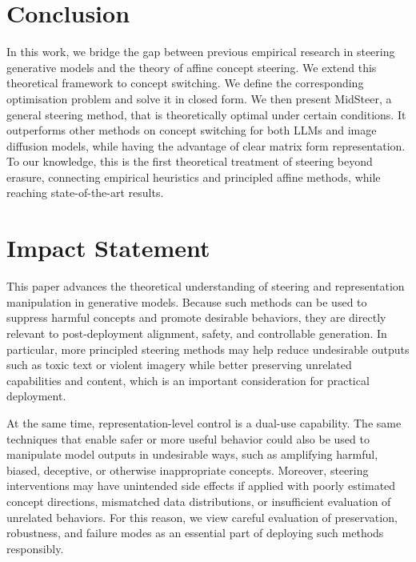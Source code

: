 \documentclass{article}
\theoremstyle{plain}
\theoremstyle{definition}
\theoremstyle{remark}
\newcommand{\ili}[1]{\textbf{[Ili]}  \; {\color{blue}#1}}
\begin{document}


\section{Conclusion}

In this work, we bridge the gap between previous empirical research in steering generative models and the theory of affine concept steering. We extend this theoretical framework to concept switching. We define the corresponding optimisation problem and solve it in closed form.
We then present MidSteer, a general steering method, that is theoretically optimal under certain conditions. It outperforms other methods on concept switching for both LLMs and image diffusion models, while having the advantage of clear matrix form representation. To our knowledge, this is the first theoretical treatment of steering beyond erasure, connecting empirical heuristics and principled affine methods, while reaching state-of-the-art results.


\section*{Impact Statement}
This paper advances the theoretical understanding of steering and representation manipulation in generative models.  Because such methods can be used to suppress harmful concepts and promote desirable behaviors, they are directly relevant to post-deployment alignment, safety, and controllable generation. In particular, more principled steering methods may help reduce undesirable outputs such as toxic text or violent imagery while better preserving unrelated capabilities and content, which is an important consideration for practical deployment.

At the same time, representation-level control is a dual-use capability. The same techniques that enable safer or more useful behavior could also be used to manipulate model outputs in undesirable ways, such as amplifying harmful, biased, deceptive, or otherwise inappropriate concepts.  Moreover, steering interventions may have unintended side effects if applied with poorly estimated concept directions, mismatched data distributions, or insufficient evaluation of unrelated behaviors. For this reason, we view careful evaluation of preservation, robustness, and failure modes as an essential part of deploying such methods responsibly.
\end{document}
